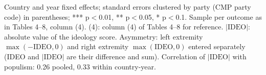 \begin{table}[ht]
{\begin{tabular}{lrrrrrrrrrrr}
\bottomrule
\end{tabular}}
\par\smallskip
\begin{minipage}{\linewidth}\scriptsize Country and year fixed effects; standard errors clustered by party (CMP party code) in parentheses; *** p$<$0.01, ** p$<$0.05, * p$<$0.1. Sample per outcome as in Tables 4--8, column (4). (4): column (4) of Tables 4--8 for reference. $|\mathrm{IDEO}|$: absolute value of the ideology score. Asymmetry: left extremity $\max(-\mathrm{IDEO},0)$ and right extremity $\max(\mathrm{IDEO},0)$ entered separately (IDEO and $|\mathrm{IDEO}|$ are their difference and sum). Correlation of $|\mathrm{IDEO}|$ with populism: 0.26 pooled, 0.33 within country-year.\end{minipage}
\end{table}
